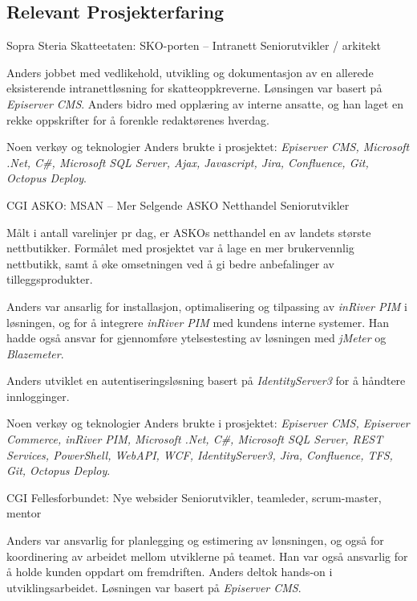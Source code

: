 \documentclass[10pt]{article} %
\begin{document}
\begin{paracol}{2}

\section{Relevant Prosjekterfaring}


{Sopra Steria} %
{Skatteetaten: SKO-porten -- Intranett} 
{Seniorutvikler / arkitekt} 
{Anders jobbet med vedlikehold, utvikling og dokumentasjon av en allerede eksisterende intranettløsning for skatteoppkreverne. Lønsingen var basert på \textit{Episerver CMS}. Anders bidro med opplæring av interne ansatte, og han laget en rekke oppskrifter for å forenkle redaktørenes hverdag.

\qquad Noen verkøy og teknologier Anders brukte i prosjektet: \textit{Episerver CMS, Microsoft .Net, C\#, Microsoft SQL Server, Ajax, Javascript, Jira, Confluence, Git, Octopus Deploy}.} 

{CGI} %
{ASKO: MSAN -- Mer Selgende ASKO Netthandel} 
{Seniorutvikler} 
{Målt i antall varelinjer pr dag, er ASKOs netthandel en av landets største nettbutikker. Formålet med prosjektet var å lage en mer brukervennlig nettbutikk, samt å øke omsetningen ved å gi bedre anbefalinger av tilleggsprodukter.

\qquad Anders var ansarlig for installasjon, optimalisering og tilpassing av \textit{inRiver PIM} i løsningen, og for å integrere 
\textit{inRiver PIM} med kundens interne systemer. Han hadde også ansvar for gjennomføre ytelsestesting av løsningen 
med \textit{jMeter} og  \textit{Blazemeter}.

\qquad Anders utviklet en autentiseringsløsning basert på \textit{IdentityServer3}
for å håndtere innlogginger.

\qquad Noen verkøy og teknologier Anders brukte i prosjektet: \textit{Episerver CMS, Episerver Commerce, inRiver PIM, Microsoft .Net, C\#, Microsoft SQL Server, REST Services, PowerShell, WebAPI, WCF, IdentityServer3, Jira, Confluence, TFS, Git, Octopus Deploy}.} 
\pagebreak


{CGI} 
{Fellesforbundet: Nye websider} 
{Seniorutvikler, teamleder, scrum-master, mentor} 
{Anders var ansvarlig for planlegging og estimering av lønsningen, og også for koordinering av arbeidet mellom utviklerne på teamet. 
Han var også ansvarlig for å holde kunden oppdart om fremdriften. Anders deltok hands-on i utviklingsarbeidet. Løsningen var basert
på \textit{Episerver CMS}.

}
\end{paracol}
\end{document}
